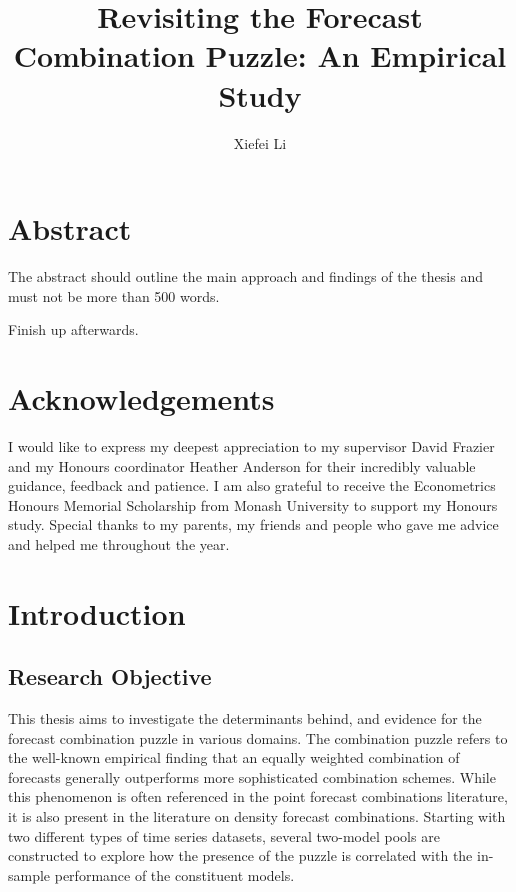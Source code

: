\documentclass{monashthesis}
\author{Xiefei Li}
\title{Revisiting the Forecast Combination Puzzle: An Empirical Study}
\begin{document}

\titlepage

{\sf\tighttoc\doublespacing}

\clearpage{}\setcounter{page}{1}

\hypertarget{abstract}{%
\chapter*{Abstract}\label{abstract}}

The abstract should outline the main approach and findings of the thesis and must not be more than 500 words.

Finish up afterwards.

\newpage

\hypertarget{acknowledgements}{%
\chapter*{Acknowledgements}\label{acknowledgements}}

I would like to express my deepest appreciation to my supervisor David Frazier and my Honours coordinator Heather Anderson for their incredibly valuable guidance, feedback and patience. I am also grateful to receive the Econometrics Honours Memorial Scholarship from Monash University to support my Honours study. Special thanks to my parents, my friends and people who gave me advice and helped me throughout the year.

\hypertarget{introduction}{%
\chapter{Introduction}\label{introduction}}

\hypertarget{research-objective}{%
\section{Research Objective}\label{research-objective}}

This thesis aims to investigate the determinants behind, and evidence for the forecast combination puzzle in various domains. The combination puzzle refers to the well-known empirical finding that an equally weighted combination of forecasts generally outperforms more sophisticated combination schemes. While this phenomenon is often referenced in the point forecast combinations literature, it is also present in the literature on density forecast combinations. Starting with two different types of time series datasets, several two-model pools are constructed to explore how the presence of the puzzle is correlated with the in-sample performance of the constituent models.
\end{document}
